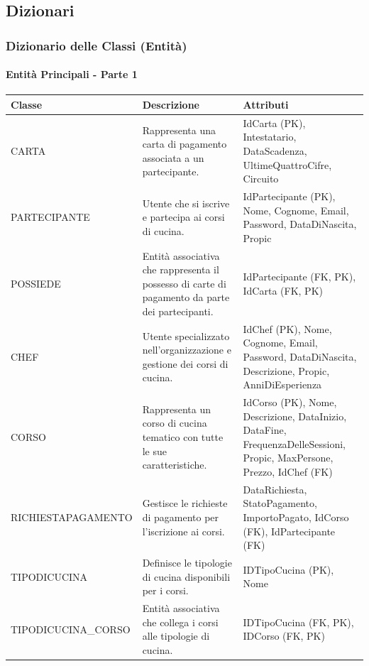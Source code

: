\subsection{Dizionari}

\subsubsection{Dizionario delle Classi (Entità)}

\paragraph{Entità Principali - Parte 1}

\begin{center}
\begin{tcolorbox}[colback=white!98!gray, colframe=myblue!80!black, title=Dizionario delle Classi (Entità) - Parte 1, arc=4mm, boxrule=0.8pt, width=0.98\textwidth]
\renewcommand{\arraystretch}{1.2}
\begin{tabularx}{\textwidth}{p{3.2cm}p{4.8cm}X}
\textbf{Classe} & \textbf{Descrizione} & \textbf{Attributi} \\
\hline
CARTA & Rappresenta una carta di pagamento associata a un partecipante. & IdCarta (PK), Intestatario, DataScadenza, UltimeQuattroCifre, Circuito \\
\hline
PARTECI\-PANTE & Utente che si iscrive e partecipa ai corsi di cucina. & IdPartecipante (PK), Nome, Cognome, Email, Password, DataDiNascita, Propic \\
\hline
POSSIEDE & Entità associativa che rappresenta il possesso di carte di pagamento da parte dei partecipanti. & IdPartecipante (FK, PK), IdCarta (FK, PK) \\
\hline
CHEF & Utente specializzato nell'organizzazione e gestione dei corsi di cucina. & IdChef (PK), Nome, Cognome, Email, Password, DataDiNascita, Descrizione, Propic, AnniDiEsperienza \\
\hline
CORSO & Rappresenta un corso di cucina tematico con tutte le sue caratteristiche. & IdCorso (PK), Nome, Descrizione, DataInizio, DataFine, FrequenzaDelleSessioni, Propic, MaxPersone, Prezzo, IdChef (FK) \\
\hline
RICHIESTA\-PAGAMENTO & Gestisce le richieste di pagamento per l'iscrizione ai corsi. & DataRichiesta, StatoPagamento, ImportoPagato, IdCorso (FK), IdPartecipante (FK) \\
\hline
TIPODICUCINA & Definisce le tipologie di cucina disponibili per i corsi. & IDTipoCucina (PK), Nome \\
\hline
TIPODICUCINA\_\-CORSO & Entità associativa che collega i corsi alle tipologie di cucina. & IDTipoCucina (FK, PK), IDCorso (FK, PK) \\
\hline
\end{tabularx}
\end{tcolorbox}
\end{center}

